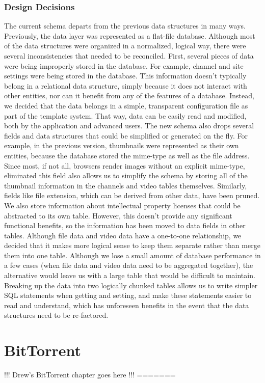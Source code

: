 \documentclass[a4paper,12pt]{report}
\begin{document}
\subsection{Design Decisions}
	The current schema departs from the previous data structures in many ways. Previously, the data layer was represented as a flat-file database. Although most of the data structures were organized in a normalized, logical way, there were several inconsistencies that needed to be reconciled.
	First, several pieces of data were being improperly stored in the database. For example, channel and site settings were being stored in the database. This information doesn't typically belong in a relational data structure, simply because it does not interact with other entities, nor can it benefit from any of the features of a database. Instead, we decided that the data belongs in a simple, transparent configuration file as part of the template system. That way, data can be easily read and modified, both by the application and advanced users. 
	The new schema also drops several fields and data structures that could be simplified or generated on the fly. For example, in the previous version, thumbnails were represented as their own entities, because the database stored the mime-type as well as the file address. Since most, if not all, browsers render images without an explicit mime-type, eliminated this field also allows us to simplify the schema by storing all of the thumbnail information in the channels and video tables themselves. Similarly, fields like file extension, which can be derived from other data, have been pruned. We also store information about intellectual property licenses that could be abstracted to its own table. However, this doesn't provide any significant functional benefits, so the information has been moved to data fields in other tables.
	Although file data and video data have a one-to-one relationship, we decided that it makes more logical sense to keep them separate rather than merge them into one table. Although we lose a small amount of database performance in a few cases (when file data and video data need to be aggregated together), the alternative would leave us with a large table that would be difficult to maintain. Breaking up the data into two logically chunked tables allows us to write simpler SQL statements when getting and setting, and make these statements easier to read and understand, which has unforeseen benefits in the event that the data structures need to be re-factored.

\chapter{BitTorrent}
!!! Drew's BitTorrent chapter goes here !!!
=======
\end{document}
